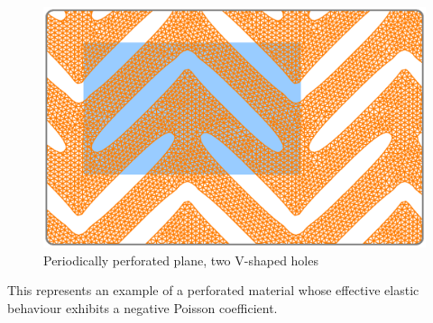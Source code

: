 \begin{figure}[ht] \centering
  \includegraphics[width=140mm]{boomerang-3.eps}
  \caption{Periodically perforated plane, two V-shaped holes}
  \label{\numb section 7.\numb fig 21}
\end{figure}

This represents an example of a perforated material whose effective elastic behaviour
exhibits a negative Poisson coefficient.
